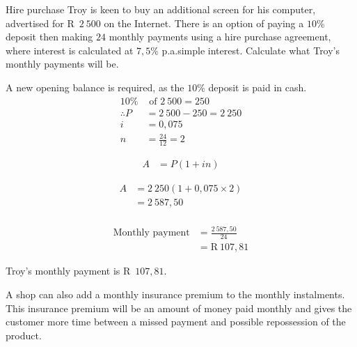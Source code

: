 \begin{wex}{Hire purchase}
{Troy is keen to buy an additional screen for his computer, advertised
  for R~$2~500$ on the Internet. There is an option of paying a $10\%$
  deposit then making $24$ monthly payments using a hire purchase
  agreement, where interest is calculated at $7,5\%$ p.a.\@ simple
  interest. Calculate what Troy's monthly payments will be.}
{
A new opening balance is required, as the $10\%$ deposit is paid in cash.
    \begin{align*}
      10\% &\mbox{ of } 2~500= 250\\
      \therefore P &= 2~500-250 =2~250\\
      i &= 0,075\\
      n &= \frac{24}{12} =2
    \end{align*}
   

    \begin{align*}
	    A &= P(1 + in)
    \end{align*}

    \begin{align*}
	A &= 2~250(1 + 0,075 \times 2)\\
	  &= 2~587,50\\
    \end{align*}

    \begin{align*}
	\mbox{Monthly payment} &= \frac{2~587,50}{24}\\
			&= \mbox{R}~107,81
    \end{align*}

    Troy's monthly payment is R~$107,81$.
}
\end{wex}


A shop can also add a monthly insurance premium to the monthly instalments. This insurance premium will be an amount of money paid monthly and gives the customer more time between a missed payment and possible repossession of the product.


